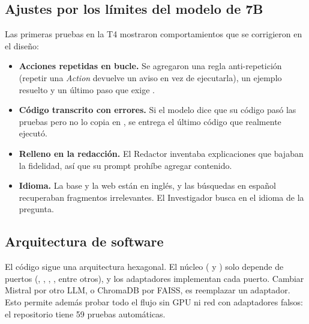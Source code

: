 \subsection{Ajustes por los límites del modelo de 7B}

Las primeras pruebas en la T4 mostraron comportamientos que se corrigieron en el diseño:
\begin{itemize}
  \item \textbf{Acciones repetidas en bucle.} Se agregaron una regla anti-repetición (repetir una \emph{Action} devuelve un aviso en vez de ejecutarla), un ejemplo resuelto y un último paso que exige .
  \item \textbf{Código transcrito con errores.} Si el modelo dice que su código pasó las pruebas pero no lo copia en , se entrega el último código que realmente ejecutó.
  \item \textbf{Relleno en la redacción.} El Redactor inventaba explicaciones que bajaban la fidelidad, así que su prompt prohíbe agregar contenido.
  \item \textbf{Idioma.} La base y la web están en inglés, y las búsquedas en español recuperaban fragmentos irrelevantes. El Investigador busca en el idioma de la pregunta.
\end{itemize}

\subsection{Arquitectura de software}

El código sigue una arquitectura hexagonal.
El núcleo ( y ) solo depende de puertos (, , , , entre otros), y los adaptadores implementan cada puerto.
Cambiar Mistral por otro LLM, o ChromaDB por FAISS, es reemplazar un adaptador.
Esto permite además probar todo el flujo sin GPU ni red con adaptadores falsos: el repositorio tiene 59 pruebas automáticas.
